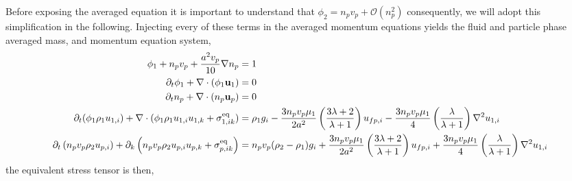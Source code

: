 Before exposing the averaged equation it is important to understand that $\phi_2 = n_p v_p + \mathcal{O}(n_p^2)$ consequently, we will adopt this simplification in the following. 
Injecting every of these terms in the averaged momentum equations yields the fluid and particle phase averaged mass, and momentum equation system, 
\begin{align*}
    \phi_1
    + n_pv_p + \frac{a^2 v_p}{10}\nabla n_p
    &= 1
    \\
    \partial_t \phi_1
    + \mathbf{\nabla}\cdot (
        \phi_1\textbf{u}_1
    )
    &= 
    0\\
    \partial_t n_p
    + \mathbf{\nabla}\cdot (
        n_p\textbf{u}_p
    )
    &= 
    0\\
    \partial_t (\phi_1 \rho_1u_{1,i})  
    + \mathbf{\nabla}\cdot (
        \phi_1 \rho_1u_{1,i}u_{1,k}
        + {\sigma}_{1,ik}^\text{eq}
    )
    &=  \rho_1 g_i 
    -  \frac{3n_p v_p \mu_1}{2 a^2} 
    \left(\frac{3\lambda+2}{\lambda+1}\right) u_{f p,i} 
    - \frac{3n_p v_p \mu_1}{4} \left(\frac{\lambda}{\lambda+1}\right)\mathbf{\nabla}^2u_{1,i}\\
    \partial_t \left(n_p v_p \rho_2 {u}_{p,i}\right)
    + \partial_{k} \left(n_p v_p \rho_2 {u}_{p,i} {u}_{p,k} 
    + {\sigma}_{p,ik}^\text{eq}
    \right)
    &= 
    n_p v_p (\rho_2 -\rho_1)g_i 
    + \frac{3n_p v_p \mu_1}{2 a^2} 
    \left(\frac{3\lambda+2}{\lambda+1}\right) u_{f p,i} 
    + \frac{3n_p v_p \mu_1}{4} \left(\frac{\lambda}{\lambda+1}\right)\mathbf{\nabla}^2u_{1,i}
\end{align*}
the equivalent stress tensor is then, 
